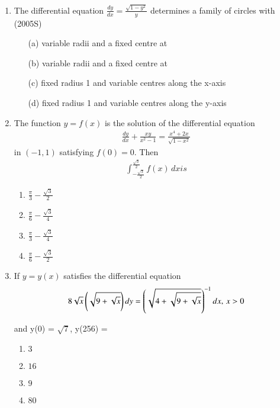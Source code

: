 \documentclass[journal,12pt,twocolumn]{IEEEtran}
\theoremstyle{remark}
\begin{document}
\begin{enumerate}
\item The differential equation $\frac{dy}{dx} = \frac{\sqrt{1-y^2}}{y}$ determines a family of circles with \hfill (2005S)
\begin{enumerate}[label=(\alph*)]
    \item [(a)] variable radii and a fixed centre at 
    \item [(b)] variable radii and a fixed centre at 
    \item [(c)] fixed radius 1 and variable centres along the x-axis
    \item [(d)] fixed radius 1 and variable centres along the y-axis
\end{enumerate}
\item The function $y = f(x)$ is the solution of the differential equation
\begin{align}
\frac{dy}{dx} + \frac{xy}{x^2-1} = \frac{x^4 + 2x}{\sqrt{1-x^2}}
\end{align}
in $(-1, 1)$ satisfying $f(0) = 0$. Then
\begin{align}
\int_{-\frac{\sqrt{3}}{2}}^{\frac{\sqrt{3}}{2}} f(x) \, dx is
\end{align}

\begin{multicols}{2}
\begin{enumerate}
    \item $\frac{\pi}{3} - \frac{\sqrt{3}}{2}$
    \item $\frac{\pi}{6} - \frac{\sqrt{3}}{4}$
    \item $\frac{\pi}{3} - \frac{\sqrt{3}}{4}$ 
    \item $\frac{\pi}{6} - \frac{\sqrt{3}}{2}$
\end{enumerate}
\end{multicols}

\item If $y = y(x)$ satisfies the differential equation
\begin{align}
8\sqrt{x} \left(\sqrt{9+\sqrt{x}}\right) dy = \left(\sqrt{4+\sqrt{9+\sqrt{x}}}\right)^{-1} dx, \, x>0
\end{align}

and y(0) = $\sqrt{7}$,  y(256) = 

\begin{multicols}{2}
\begin{enumerate}
    \item $3$
    \item $16$ 
    \item $9$
    \item $80$
\end{enumerate}
\end{multicols}
\end{enumerate}
\end{document}
